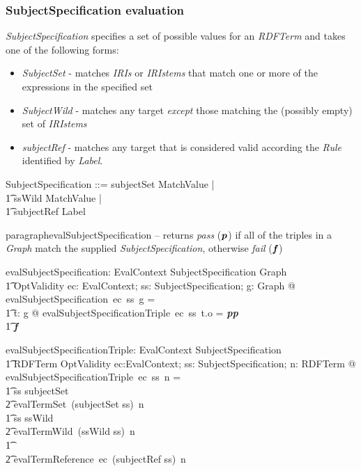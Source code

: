 \documentclass[fuzz]{llncs}
\def\pass{\textbf{\textit{p}}}
\def\fail{\textbf{\textit{f}}}
\def\zc{\textit}
\begin{document}
\subsubsection{SubjectSpecification evaluation}
\zc{SubjectSpecification} specifies a set of possible values for an \zc{RDFTerm} and takes one of the following forms:
\begin{itemize}
\item \zc{SubjectSet} - matches \zc{IRIs} or \zc{IRIstems} that match one or more of the expressions in the specified set
\item \zc{SubjectWild} - matches any target \emph{except} those matching the (possibly empty) set of \zc{IRIstems}
\item \zc{subjectRef} - matches any target that is considered valid according the \zc{Rule} identified by \zc{Label}.
\end{itemize}
\begin{zed}
SubjectSpecification ::=  subjectSet \ldata \power MatchValue \rdata | \\
\t1 ssWild \ldata \power MatchValue \rdata | \\
\t1 subjectRef \ldata Label \rdata
\end{zed}

paragraph{evalSubjectSpecification} -- returns \zc{pass} ($\pass$) if all of the triples in a \zc{Graph} 
match the supplied \zc{SubjectSpecification}, otherwise \zc{fail} ($\fail$)
\begin{axdef}
   evalSubjectSpecification: EvalContext \fun SubjectSpecification \fun Graph \fun \\
\t1 OptValidity
\where
   \forall ec: EvalContext; ss: SubjectSpecification; g: Graph @ \\ evalSubjectSpecification~ec~ss~g = \\
\t1 \IF \forall t: g @ evalSubjectSpecificationTriple~ec~ss~t.o = \pass \THEN \pass \\
\t1 \ELSE \fail
\end{axdef}
\begin{axdef}
   evalSubjectSpecificationTriple: EvalContext \fun SubjectSpecification \fun \\
\t1 RDFTerm \fun OptValidity
\where
   \forall ec:EvalContext; ss: SubjectSpecification; n: RDFTerm @ \\
  evalSubjectSpecificationTriple~ec~ss~n = \\
\t1 \IF ss \in \ran subjectSet \THEN \\
\t2 evalTermSet~(subjectSet \inv ss)~n \\
\t1 \ELSE \IF ss \in \ran ssWild \THEN \\
\t2 evalTermWild~(ssWild \inv ss)~n \\
\t1 \ELSE \\
\t2 evalTermReference~ec~(subjectRef \inv ss)~n
\end{axdef}
\end{document}
